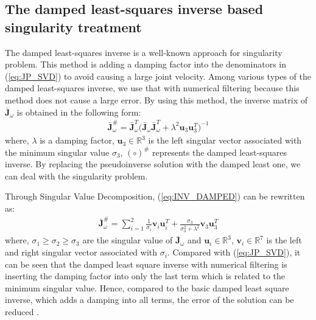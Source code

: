\documentclass[preprint,12pt]{elsarticle}
\def\eq#1{{(\ref{eq:#1})}}
\def\R#1{{\in\mathbb{R}^{#1}}}
\begin{document}
\subsection{The damped least-squares inverse based singularity treatment}
\label{sec:SIN_DLS}
The damped least-squares inverse is a well-known approach for singularity problem.
This method is adding a damping factor into the denominators in \eq{JP_SVD} to avoid
causing a large joint velocity.
Among various types of the damped least-squares inverse,
we use that with numerical filtering because this method does not cause a large error.
By using this method,
the inverse matrix of $\bar{\bm{J}}_{\omega}$ is obtained in the following form:
%
\begin{align}
  \bar{\bm{J}}_{\omega}^{\#} = \bar{\bm{J}}_{\omega}^{T}\Big(\bar{\bm{J}}_{\omega}\bar{\bm{J}}_{\omega}^{T} +
  \lambda^{2}\bm{u}_{3}\bm{u}_{3}^{T}\Big)^{-1}\label{eq:INV_DAMPED}
\end{align}
%
where, $\lambda$ is a damping factor,
$\bm{u}_{3}\R{3}$ is the left singular vector associated with the minimum singular value $\sigma_{3}$,
$(\circ)^{\#}$ represents the damped least-squares inverse.
By replacing the pseudoinverse solution with the damped least one,
we can deal with the singularity problem.

Through Singular Value Decomposition,
\eq{INV_DAMPED} can be rewritten as:
%
\begin{align}
  \bar{\bm{J}}_{\omega}^{\#} = \sum_{i = 1}^{2}\frac{1}{\sigma_{i}}\bm{v}_{i}\bm{u}_{i}^{T} +
  \frac{\sigma_{3}}{\sigma_{3}^{2} + \lambda^{2}}\bm{v}_{3}\bm{u}_{3}^{T}\label{eq:INV_SVD}
\end{align}
%
where, $\sigma_{1} \geq \sigma_{2} \geq \sigma_{3}$ are the singular value of $\bar{\bm{J}}_{\omega}$ and
$\bm{u}_{i}\R{3}$, $\bm{v}_{i}\R{7}$ is the left and right singular vector
associated with $\sigma_{i}$.
Compared with \eq{JP_SVD},
it can be seen that the damped least square inverse with numerical filtering
is inserting the damping factor into only the last term which is related to the minimum singular value.
Hence,
compared to the basic damped least square inverse,
which adds a damping into all terms,
the error of the solution can be reduced \cite{Chiaverini1997}.
\end{document}
